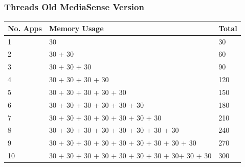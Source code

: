 \subsubsection{Threads Old MediaSense Version}
\begin{center}
    \begin{tabular}{ | l | p{9cm} | l |}
    \hline
    No. Apps			 								& Memory Usage 													& Total\\ \hline
    1 													& 30 															& 30\\ \hline
    2 													& 30 + 30														& 60\\ \hline
    3 													& 30 + 30 + 30 													& 90\\ \hline
    4 													& 30 + 30 + 30 + 30												& 120\\ \hline
    5 													& 30 + 30 + 30 + 30 + 30										& 150\\ \hline
    6 													& 30 + 30 + 30 + 30 + 30 + 30									& 180\\ \hline
    7 													& 30 + 30 + 30 + 30 + 30 + 30 + 30								& 210\\ \hline
    8 													& 30 + 30 + 30 + 30 + 30 + 30 + 30	+ 30						& 240\\ \hline
    9 													& 30 + 30 + 30 + 30 + 30 + 30 + 30	+ 30 + 30					& 270\\ \hline
    10 													& 30 + 30 + 30 + 30 + 30 + 30 + 30	+ 30+ 30 + 30				& 300\\ \hline
    \end{tabular}
\end{center}

